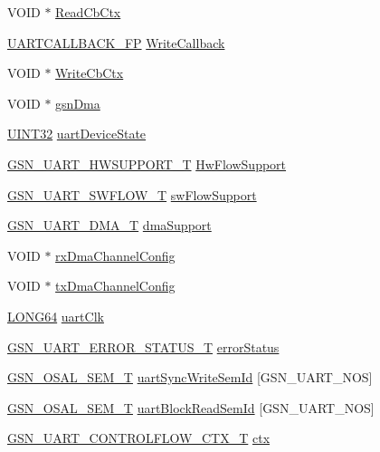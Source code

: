 \begin{DoxyCompactItemize}
VOID $\ast$ \hyperlink{a00263_ab670c794162551aa7f8c6a4103007e7b}{ReadCbCtx}
\item 
\hyperlink{a00600_a2e597592e12f52e6b9f19cffdcd2378f}{UARTCALLBACK\_\-FP} \hyperlink{a00263_aa2e51ff716434c03592f4fc183263a0f}{WriteCallback}
\item 
VOID $\ast$ \hyperlink{a00263_aa649829459755e39af4893f8557347e5}{WriteCbCtx}
\item 
VOID $\ast$ \hyperlink{a00263_a5b5e40cd759417310e7a487b029488e8}{gsnDma}
\item 
\hyperlink{a00660_gae1e6edbbc26d6fbc71a90190d0266018}{UINT32} \hyperlink{a00263_ab86c2431a835b3c0682d5b34915f2914}{uartDeviceState}
\item 
\hyperlink{a00656_gaf4df97392dfefed655a81fe500a74162}{GSN\_\-UART\_\-HWSUPPORT\_\-T} \hyperlink{a00263_afcdcf525c04f0b05dabb1816248b6bd9}{HwFlowSupport}
\item 
\hyperlink{a00656_gae4fa00cd25fb7d023d1016b79b520542}{GSN\_\-UART\_\-SWFLOW\_\-T} \hyperlink{a00263_aeb73ed49d5b7594525fafe0f0ff0590f}{swFlowSupport}
\item 
\hyperlink{a00656_gafc3ee1b15b6b7039d697e48cabeba7de}{GSN\_\-UART\_\-DMA\_\-T} \hyperlink{a00263_a528c61545e39ea28f9a468044a298376}{dmaSupport}
\item 
VOID $\ast$ \hyperlink{a00263_a8c322936bd6cb1f93600dc207bb8fd0a}{rxDmaChannelConfig}
\item 
VOID $\ast$ \hyperlink{a00263_a4c07197d124d1ed9e821f15b3b78a066}{txDmaChannelConfig}
\item 
\hyperlink{a00660_gae57305825c7d329ad8a3065ae045e875}{LONG64} \hyperlink{a00263_a813915182cec971bec00857a79508bad}{uartClk}
\item 
\hyperlink{a00265}{GSN\_\-UART\_\-ERROR\_\-STATUS\_\-T} \hyperlink{a00263_aaba99cbc2d5e665d9cae1980b3a426cb}{errorStatus}
\item 
\hyperlink{a00628_gab4b3554407ce22b940e2fcd3faf5fd47}{GSN\_\-OSAL\_\-SEM\_\-T} \hyperlink{a00263_afe5b5d88136be9f872a6a42123f04a98}{uartSyncWriteSemId} \mbox{[}GSN\_\-UART\_\-NOS\mbox{]}
\item 
\hyperlink{a00628_gab4b3554407ce22b940e2fcd3faf5fd47}{GSN\_\-OSAL\_\-SEM\_\-T} \hyperlink{a00263_a8b1b170dfa44896eb8c7f1eef0b8e9bd}{uartBlockReadSemId} \mbox{[}GSN\_\-UART\_\-NOS\mbox{]}
\item 
\hyperlink{a00264}{GSN\_\-UART\_\-CONTROLFLOW\_\-CTX\_\-T} \hyperlink{a00263_a22dc5420bfc134c3b3292f60fda39120}{ctx}
\end{DoxyCompactItemize}


